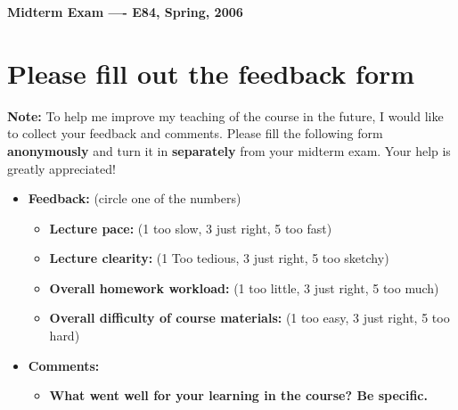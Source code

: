 \usepackage{html}

\begin{center}
{\Large \bf  Midterm Exam ---- E84, Spring, 2006}
\end{center}

\section*{Please fill out the feedback form}

{\bf Note: } To help me improve my teaching of the course in the future, I would 
like to collect your feedback and comments. Please fill the following form 
{\bf anonymously} and turn it in {\bf separately} from your midterm exam. Your 
help is greatly appreciated!

\begin{itemize}
\item {\bf Feedback:} (circle one of the numbers)
\begin{itemize}

\item {\bf Lecture pace:} (1 too slow, 3 just right, 5 too fast)


\item {\bf Lecture clearity:} (1 Too tedious, 3 just right, 5 too sketchy)


\item {\bf Overall homework workload:} (1 too little, 3 just right, 5 too much)


\item {\bf Overall difficulty of course materials:} (1 too easy, 3 just right, 5 too hard)

\end{itemize} 

\item {\bf Comments:}
\begin{itemize}

\item {\bf What went well for your learning in the course? Be specific.}


\end{itemize}
\end{itemize}
